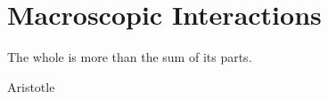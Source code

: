 \chapter{Macroscopic Interactions}
\epigraph{ \begin{SingleSpace}The whole is more than the sum of its parts.\end{SingleSpace} }{Aristotle}
